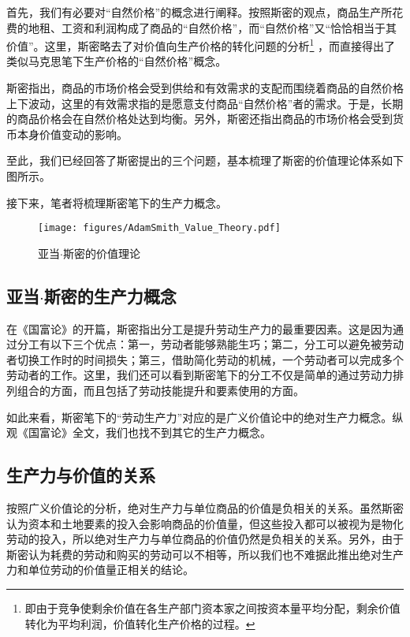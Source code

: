 首先，我们有必要对“自然价格”的概念进行阐释。按照斯密的观点，商品生产所花费的地租、工资和利润构成了商品的“自然价格”，而“自然价格”又“恰恰相当于其价值”\cite[49]{YaDang*SiMiGuoFuLun2015}。这里，斯密略去了对价值向生产价格的转化问题的分析\footnote{即由于竞争使剩余价值在各生产部门资本家之间按资本量平均分配，剩余价值转化为平均利润，价值转化生产价格的过程\cite{XieFuShengXiFangXueZheGuanYuMaKeSiJieZhiZhuanXingLiLunYanJiuShuPing2000}。}
，而直接得出了类似马克思笔下生产价格的“自然价格”概念。

斯密指出，商品的市场价格会受到供给和有效需求的支配而围绕着商品的自然价格上下波动，这里的有效需求指的是愿意支付商品“自然价格”者的需求\cite[50]{YaDang*SiMiGuoFuLun2015}。于是，长期的商品价格会在自然价格处达到均衡\cite[50]{YaDang*SiMiGuoFuLun2015}。另外，斯密还指出商品的市场价格会受到货币本身价值变动的影响\cite[28-31]{YaDang*SiMiGuoFuLun2015}。

至此，我们已经回答了斯密提出的三个问题，基本梳理了斯密的价值理论体系如下图所示。

接下来，笔者将梳理斯密笔下的生产力概念。

\begin{figure}
    \centering
    \caption{亚当$\cdot$斯密的价值理论}
    \label{figures:AdamSmith_Value_Theory}
    \texttt{[image: figures/AdamSmith\_Value\_Theory.pdf]}
\end{figure}

\subsection{亚当$\cdot$斯密的生产力概念}

在《国富论》的开篇，斯密指出分工是提升劳动生产力的最重要因素\cite[3]{YaDang*SiMiGuoFuLun2015}。这是因为通过分工有以下三个优点：第一，劳动者能够熟能生巧；第二，分工可以避免被劳动者切换工作时的时间损失；第三，借助简化劳动的机械，一个劳动者可以完成多个劳动者的工作。\cite[6]{YaDang*SiMiGuoFuLun2015}这里，我们还可以看到斯密笔下的分工不仅是简单的通过劳动力排列组合的方面，而且包括了劳动技能提升和要素使用的方面。

如此来看，斯密笔下的“劳动生产力”对应的是广义价值论中的绝对生产力概念。纵观《国富论》全文，我们也找不到其它的生产力概念。

\subsection{生产力与价值的关系}

按照广义价值论的分析，绝对生产力与单位商品的价值是负相关的关系。虽然斯密认为资本和土地要素的投入会影响商品的价值量，但这些投入都可以被视为是物化劳动的投入，所以绝对生产力与单位商品的价值仍然是负相关的关系。另外，由于斯密认为耗费的劳动和购买的劳动可以不相等，所以我们也不难据此推出绝对生产力和单位劳动的价值量正相关的结论。


